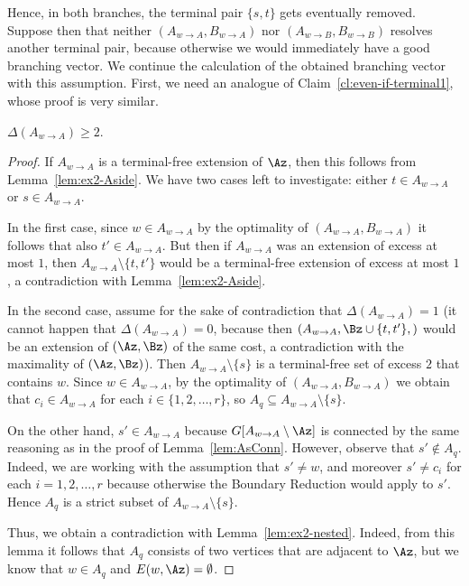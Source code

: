 Hence, in both branches, the terminal pair $\{s,t\}$ gets eventually removed. Suppose then that neither $(A_{w\to A},B_{w\to A})$ nor $(A_{w\to B},B_{w\to B})$ resolves another terminal pair, because otherwise we would immediately have a good branching vector. We continue the calculation of the obtained branching vector with this assumption. First, we need an analogue of Claim~\ref{cl:even-if-terminal1}, whose proof is very similar.

\begin{myclaim}\label{cl:even-if-terminal2}
$\Delta(A_{w\to A})\geq 2$.
\end{myclaim}
\begin{proof}
If $A_{w\to A}$ is a terminal-free extension of $\Az$, then this follows from Lemma~\ref{lem:ex2-Aside}. We have two cases left to investigate: either $t\in A_{w\to A}$ or $s\in A_{w\to A}$.

In the first case, since $w\in A_{w\to A}$ by the optimality of $(A_{w\to A},B_{w\to A})$ it follows that also $t'\in A_{w\to A}$. But then if $A_{w\to A}$ was an extension of excess at most $1$, then $A_{w\to A}\setminus \{t,t'\}$ would be a terminal-free extension of excess at most $1$, a contradiction with Lemma~\ref{lem:ex2-Aside}.

In the second case, assume for the sake of contradiction that $\Delta(A_{w\to A})=1$ (it cannot happen that $\Delta(A_{w\to A})=0$, because then $(A_{w\to A},\Bz\cup \{t,t'\},)$ would be an extension of $(\Az,\Bz)$ of the same cost, a contradiction with the maximality of $(\Az,\Bz)$). Then $A_{w\to A}\setminus \{s\}$ is a terminal-free set of excess $2$ that contains $w$. Since $w\in A_{w\to A}$, by the optimality of $(A_{w\to A},B_{w\to A})$ we obtain that $c_i\in A_{w\to A}$ for each $i\in \{1,2,\ldots,r\}$, so $A_q\subseteq A_{w\to A}\setminus \{s\}$. 

On the other hand, $s'\in A_{w\to A}$ because $G[A_{w\to A}\setminus \Az]$ is connected by the same reasoning as in the proof of Lemma~\ref{lem:AsConn}. However, observe that $s'\notin A_q$. Indeed, we are working with the assumption that $s'\neq w$, and moreover $s'\neq c_i$ for each $i=1,2,\ldots,r$ because otherwise the Boundary Reduction would apply to $s'$. Hence $A_q$ is a strict subset of $A_{w\to A}\setminus \{s\}$. 

Thus, we obtain a contradiction with Lemma~\ref{lem:ex2-nested}. Indeed, from this lemma it follows that $A_q$ consists of two vertices that are adjacent to $\Az$, but we know that $w\in A_q$ and $E(w,\Az)=\emptyset$.
\end{proof}

